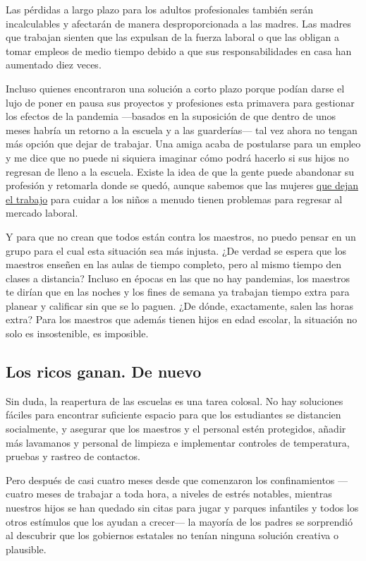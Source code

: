 Las pérdidas a largo plazo para los adultos profesionales también serán
incalculables y afectarán de manera desproporcionada a las madres. Las
madres que trabajan sienten que las expulsan de la fuerza laboral o que
las obligan a tomar empleos de medio tiempo debido a que sus
responsabilidades en casa han aumentado diez veces.

Incluso quienes encontraron una solución a corto plazo porque podían
darse el lujo de poner en pausa sus proyectos y profesiones esta
primavera para gestionar los efectos de la pandemia ---basados en la
suposición de que dentro de unos meses habría un retorno a la escuela y
a las guarderías--- tal vez ahora no tengan más opción que dejar de
trabajar. Una amiga acaba de postularse para un empleo y me dice que no
puede ni siquiera imaginar cómo podrá hacerlo si sus hijos no regresan
de lleno a la escuela. Existe la idea de que la gente puede abandonar su
profesión y retomarla donde se quedó, aunque sabemos que las mujeres
\href{https://www.nytimes3xbfgragh.onion/2014/09/07/upshot/a-child-helps-your-career-if-youre-a-man.html}{que
dejan el trabajo} para cuidar a los niños a menudo tienen problemas para
regresar al mercado laboral.

Y para que no crean que todos están contra los maestros, no puedo pensar
en un grupo para el cual esta situación sea más injusta. ¿De verdad se
espera que los maestros enseñen en las aulas de tiempo completo, pero al
mismo tiempo den clases a distancia? Incluso en épocas en las que no hay
pandemias, los maestros te dirían que en las noches y los fines de
semana ya trabajan tiempo extra para planear y calificar sin que se lo
paguen. ¿De dónde, exactamente, salen las horas extra? Para los maestros
que además tienen hijos en edad escolar, la situación no solo es
insostenible, es imposible.

\hypertarget{los-ricos-ganan-de-nuevo}{%
\subsection{Los ricos ganan. De nuevo}\label{los-ricos-ganan-de-nuevo}}

Sin duda, la reapertura de las escuelas es una tarea colosal. No hay
soluciones fáciles para encontrar suficiente espacio para que los
estudiantes se distancien socialmente, y asegurar que los maestros y el
personal estén protegidos, añadir más lavamanos y personal de limpieza e
implementar controles de temperatura, pruebas y rastreo de contactos.

Pero después de casi cuatro meses desde que comenzaron los
confinamientos ---cuatro meses de trabajar a toda hora, a niveles de
estrés notables, mientras nuestros hijos se han quedado sin citas para
jugar y parques infantiles y todos los otros estímulos que los ayudan a
crecer--- la mayoría de los padres se sorprendió al descubrir que los
gobiernos estatales no tenían ninguna solución creativa o plausible.

